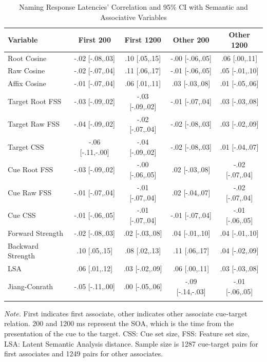 \documentclass[english,,man]{apa6}
\begin{document}
\begin{table}[tbp]
\begin{center}
\begin{threeparttable}
\caption{\label{tab:name-table}Naming Response Latencies' Correlation and 95\% CI with Semantic and Associative Variables}
\small{
\begin{tabular}{lcccc}
\toprule
Variable & \multicolumn{1}{c}{First 200} & \multicolumn{1}{c}{First 1200} & \multicolumn{1}{c}{Other 200} & \multicolumn{1}{c}{Other 1200}\\
\midrule
Root Cosine & -.02 [-.08,.03] & .10 [.05,.15] & -.00 [-.06,.05] & .06 [.00,.11]\\
Raw Cosine & -.02 [-.07,.04] & .11 [.06,.17] & -.01 [-.06,.05] & .05 [-.01,.10]\\
Affix Cosine & -.01 [-.07,.04] & .06 [.01,.11] & .03 [-.03,.08] & .01 [-.05,.06]\\
Target Root FSS & -.03 [-.09,.02] & -.03 [-.09,.02] & -.01 [-.07,.04] & .03 [-.03,.08]\\
Target Raw FSS & -.04 [-.09,.02] & -.02 [-.07,.04] & -.02 [-.08,.03] & .03 [-.02,.09]\\
Target CSS & -.06 [-.11,-.00] & -.04 [-.09,.02] & -.02 [-.08,.03] & .01 [-.04,.07]\\
Cue Root FSS & -.03 [-.09,.02] & -.00 [-.06,.05] & .02 [-.03,.08] & -.02 [-.07,.04]\\
Cue Raw FSS & -.01 [-.07,.04] & -.01 [-.07,.04] & .02 [-.04,.07] & -.02 [-.07,.04]\\
Cue CSS & -.01 [-.06,.05] & -.01 [-.07,.04] & -.01 [-.07,.04] & -.01 [-.06,.05]\\
Forward Strength & -.02 [-.08,.03] & .02 [-.03,.08] & .04 [-.01,.10] & .04 [-.01,.10]\\
Backward Strength & .10 [.05,.15] & .08 [.02,.13] & .11 [.06,.17] & .04 [-.02,.09]\\
LSA & .06 [.01,.12] & .03 [-.02,.09] & .06 [.00,.11] & .03 [-.03,.08]\\
Jiang-Conrath & -.05 [-.11,.00] & .00 [-.05,.06] & -.09 [-.14,-.03] & -.01 [-.06,.05]\\
\bottomrule
\addlinespace
\end{tabular}
}
\begin{tablenotes}[para]
\normalsize{\textit{Note.} First indicates first associate, other indicates other associate cue-target relation. 200 and 1200 ms represent the SOA, which is the time from the presentation of the cue to the target. CSS: Cue set size, FSS: Feature set size, LSA: Latent Semantic Analysis distance. Sample size is 1287 cue-target pairs for first associates and 1249 pairs for other associates.}
\end{tablenotes}
\end{threeparttable}
\end{center}
\end{table}
\end{document}
